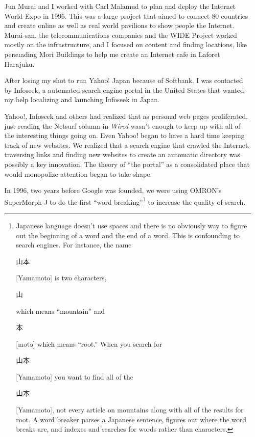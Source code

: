 Jun Murai and I worked with Carl Malamud to plan and deploy the Internet World Expo in 1996. This was a large project that aimed to connect 80 countries and create online as well as real world pavilions to show people the Internet. Murai-san, the telecommunications companies and the \ac{WIDE} Project worked mostly on the infrastructure, and I focused on content and finding locations, like persuading Mori Buildings to help me create an Internet cafe in Laforet Harajuku.

After losing my shot to run Yahoo! Japan because of Softbank, I was contacted by Infoseek, a automated search engine portal in the United States that wanted my help localizing and launching Infoseek in Japan.

Yahoo!, Infoseek and others had realized  that as personal web pages proliferated, just reading the Netsurf column in \textit{Wired} wasn't enough to keep up with all of the interesting things going on. Even Yahoo! began to have a hard time keeping track of new websites. We realized that a search engine that crawled the Internet, traversing links and finding new websites to create an automatic directory was possibly a key innovation. The theory of ``the portal'' as a consolidated place that would monopolize attention began to take shape.

In 1996, two years before Google was founded, we were using OMRON's SuperMorph-J to do the first ``word breaking''\footnote{Japanese language doesn't use spaces and there is no obviously way to figure out the beginning of a word and the end of a word. This is confounding to search engines. For instance, the name \begin{CJK}{UTF8}{min}山本\end{CJK} [Yamamoto] is two characters, \begin{CJK}{UTF8}{min}山\end{CJK} which means ``mountain'' and \begin{CJK}{UTF8}{min}本\end{CJK} [moto] which means ``root.'' When you search for \begin{CJK}{UTF8}{min}山本\end{CJK} [Yamamoto] you want to find all of the \begin{CJK}{UTF8}{min}山本\end{CJK} [Yamamoto], not every article on mountains along with all of the results for root. A word breaker parses a Japanese sentence, figures out where the word breaks are, and indexes and searches for words rather than characters.} to increase the quality of search.

